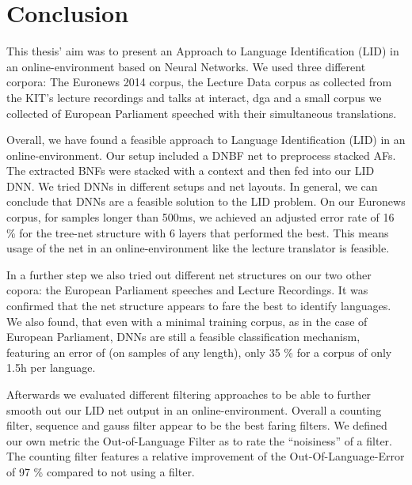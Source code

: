 
\chapter{Conclusion}
\label{ch:Conclusion}

This thesis' aim was to present an Approach to Language Identification (LID) in an online-environment based on Neural Networks. We used three different corpora: The Euronews 2014 corpus, the Lecture Data corpus as collected from the KIT's lecture recordings and talks at interact, dga and a small corpus we collected of European Parliament speeched with their simultaneous translations.

Overall, we have found a feasible approach to Language Identification (LID) in an online-environment. Our setup included a DNBF net to preprocess stacked AFs. The extracted BNFs were stacked with a context and then fed into our LID DNN.  We tried DNNs in different setups and net layouts. In general, we can conclude that DNNs are a feasible solution to the LID problem. On our Euronews corpus, for samples longer than 500ms, we achieved an adjusted error rate of 16 \% for the tree-net structure with 6 layers that performed the best. This means usage of the net in an online-environment like the lecture translator is feasible.

In a further step we also tried out different net structures on our two other copora: the European Parliament speeches and Lecture Recordings. It was confirmed that the net structure appears to fare the best to identify languages. We also found, that even with a minimal training corpus, as in the case of European Parliament, DNNs are still a feasible classification mechanism, featuring an error of (on samples of any length), only 35 \% for a corpus of only 1.5h per language.

Afterwards we evaluated different filtering approaches to be able to further smooth out our LID net output in an online-environment. Overall a counting filter, sequence and gauss filter appear to be the best faring filters. We defined our own metric the Out-of-Language Filter as to rate the ``noisiness'' of a filter. The counting filter features a relative improvement of the Out-Of-Language-Error of 97 \% compared to not using a filter.

